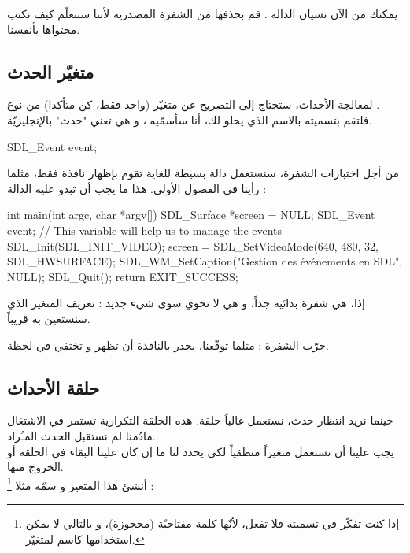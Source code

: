 \begin{information}
يمكنك من الآن نسيان الدالة
.
قم بحذفها من الشفرة المصدرية لأننا سنتعلّم كيف نكتب محتواها بأنفسنا.
\end{information}

\subsection{متغيّر الحدث}

لمعالجة الأحداث، ستحتاج إلى التصريح عن متغيّر (واحد فقط، كن متأكدا) من نوع 
.\\
فلتقم بتسميته بالاسم الذي يحلو لك، أنا سأسمّيه 
،
و هي تعني "حدث" بالإنجليزيّة.

\begin{Csource}
SDL_Event event;
\end{Csource}

من أجل اختبارات الشفرة، سنستعمل دالة
بسيطة للغاية تقوم بإظهار نافذة فقط، مثلما رأينا في الفصول الأولى. هذا ما يجب أن تبدو عليه الدالة
 :

\begin{Csource}
int main(int argc, char *argv[])
{
	SDL_Surface *screen = NULL;
	SDL_Event event; // This variable will help us to manage the events
	SDL_Init(SDL_INIT_VIDEO);
	screen = SDL_SetVideoMode(640, 480, 32, SDL_HWSURFACE);
	SDL_WM_SetCaption("Gestion des événements en SDL", NULL);
	SDL_Quit();
	return EXIT_SUCCESS;
}
\end{Csource}

إذا، هي شفرة بدائية جداً، و هي لا تحوي سوى شيء جديد : تعريف المتغير
الذي سنستعين به قريباً.

جرّب الشفرة : مثلما توقّعنا، يجدر بالنافذة أن تظهر و تختفي في لحظة.

\subsection{حلقة الأحداث}

حينما نريد انتظار حدث، نستعمل غالباً حلقة. هذه الحلقة التكرارية تستمر في الاشتغال مادُمنا لم نستقبل الحدث المـُراد.\\
يجب علينا أن نستعمل متغيراً منطقياً لكي يحدد لنا ما إن كان علينا البقاء في الحلقة أو الخروج منها.\\
أنشئ هذا المتغير و سمّه مثلا
\footnote{
إذا كنت تفكّر في تسميته
فلا تفعل، لأنّها كلمة مفتاحيّة (محجوزة)، و بالتالي لا يمكن استخدامها كاسم لمتغيّر.} :

